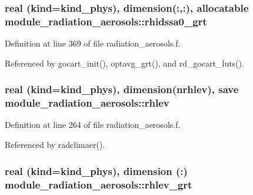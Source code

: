 \subsubsection[{\texorpdfstring{rhidssa0\+\_\+grt}{rhidssa0_grt}}]{\setlength{\rightskip}{0pt plus 5cm}real (kind=kind\+\_\+phys), dimension(\+:,\+:), allocatable module\+\_\+radiation\+\_\+aerosols\+::rhidssa0\+\_\+grt\hspace{0.3cm}{\ttfamily [private]}}\hypertarget{namespacemodule__radiation__aerosols_aea46db63db26a316e73640bc63f75383}{}\label{namespacemodule__radiation__aerosols_aea46db63db26a316e73640bc63f75383}


Definition at line 369 of file radiation\+\_\+aerosols.\+f.



Referenced by gocart\+\_\+init(), optavg\+\_\+grt(), and rd\+\_\+gocart\+\_\+luts().

\subsubsection[{\texorpdfstring{rhlev}{rhlev}}]{\setlength{\rightskip}{0pt plus 5cm}real (kind=kind\+\_\+phys), dimension({\bf nrhlev}), save module\+\_\+radiation\+\_\+aerosols\+::rhlev\hspace{0.3cm}{\ttfamily [private]}}\hypertarget{namespacemodule__radiation__aerosols_a6aa3218393ea05cab77ab7867cfeab90}{}\label{namespacemodule__radiation__aerosols_a6aa3218393ea05cab77ab7867cfeab90}


Definition at line 264 of file radiation\+\_\+aerosols.\+f.



Referenced by radclimaer().

\subsubsection[{\texorpdfstring{rhlev\+\_\+grt}{rhlev_grt}}]{\setlength{\rightskip}{0pt plus 5cm}real (kind=kind\+\_\+phys), dimension (\+:) module\+\_\+radiation\+\_\+aerosols\+::rhlev\+\_\+grt\hspace{0.3cm}{\ttfamily [private]}}\hypertarget{namespacemodule__radiation__aerosols_ace40d50e36de1fc08c4ff35f6d8dbda9}{}\label{namespacemodule__radiation__aerosols_ace40d50e36de1fc08c4ff35f6d8dbda9}


